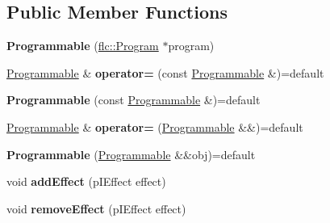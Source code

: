 \subsection*{Public Member Functions}
\begin{DoxyCompactItemize}
\item 
{\bfseries Programmable} (\hyperlink{classflw_1_1flc_1_1Program}{flc\+::\+Program} $\ast$program)\hypertarget{classflw_1_1flf_1_1Programmable_a15a01f84dd1e918fc3fb27fc679e4f72}{}\label{classflw_1_1flf_1_1Programmable_a15a01f84dd1e918fc3fb27fc679e4f72}

\item 
\hyperlink{classflw_1_1flf_1_1Programmable}{Programmable} \& {\bfseries operator=} (const \hyperlink{classflw_1_1flf_1_1Programmable}{Programmable} \&)=default\hypertarget{classflw_1_1flf_1_1Programmable_a94afe615698e45de4622bfbe6ed0f29f}{}\label{classflw_1_1flf_1_1Programmable_a94afe615698e45de4622bfbe6ed0f29f}

\item 
{\bfseries Programmable} (const \hyperlink{classflw_1_1flf_1_1Programmable}{Programmable} \&)=default\hypertarget{classflw_1_1flf_1_1Programmable_a4662d11c4fb5a887ef4d973acaea2d97}{}\label{classflw_1_1flf_1_1Programmable_a4662d11c4fb5a887ef4d973acaea2d97}

\item 
\hyperlink{classflw_1_1flf_1_1Programmable}{Programmable} \& {\bfseries operator=} (\hyperlink{classflw_1_1flf_1_1Programmable}{Programmable} \&\&)=default\hypertarget{classflw_1_1flf_1_1Programmable_a23caca5944c7b6a88601ca016349564b}{}\label{classflw_1_1flf_1_1Programmable_a23caca5944c7b6a88601ca016349564b}

\item 
{\bfseries Programmable} (\hyperlink{classflw_1_1flf_1_1Programmable}{Programmable} \&\&obj)=default\hypertarget{classflw_1_1flf_1_1Programmable_a51e65f68660ff6402694d6720e62296b}{}\label{classflw_1_1flf_1_1Programmable_a51e65f68660ff6402694d6720e62296b}

\item 
void {\bfseries add\+Effect} (p\+I\+Effect effect)\hypertarget{classflw_1_1flf_1_1Programmable_a30b5fd3b8d68e75ab0a0bdcaa2bc0100}{}\label{classflw_1_1flf_1_1Programmable_a30b5fd3b8d68e75ab0a0bdcaa2bc0100}

\item 
void {\bfseries remove\+Effect} (p\+I\+Effect effect)\hypertarget{classflw_1_1flf_1_1Programmable_a17959aba99a55f54931892437c39f58c}{}\label{classflw_1_1flf_1_1Programmable_a17959aba99a55f54931892437c39f58c}


\end{DoxyCompactItemize}

